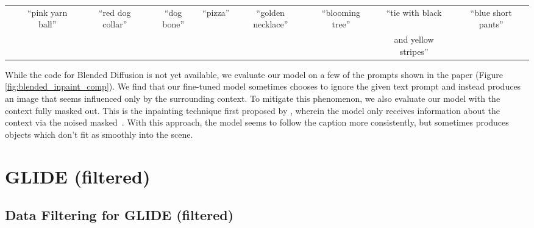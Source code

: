 \documentclass{article}
\newcommand{\modelname}{GLIDE}
\begin{document}
\begin{figure*}[t]
\begin{tabular}{ccccccccc}
        &
        \scriptsize{``pink yarn ball''} &
        \scriptsize{``red dog collar''} &
        \scriptsize{``dog bone''} &
        \scriptsize{``pizza''} &
        \scriptsize{``golden necklace''} &
        \scriptsize{``blooming tree''} &
        \scriptsize{``tie with black} &
        \scriptsize{``blue short pants''} \\

        &&&&&&& \scriptsize{and yellow stripes''} & \\
    \end{tabular}
    
    \caption{Comparison of image inpainting quality on real images. (1) Local CLIP-guided diffusion \citep{clipdiff}, (2) PaintByWord++ \citep{paintbyword,blendeddiff}, (3) Blended Diffusion \citep{blendeddiff}. For our results, we follow \citet{blendeddiff} and use CLIP to select the best of 64 samples. Our fine-tuned samples have more realistic lighting, shadows and textures, but sometimes don't focus on the prompt (eg. golden necklace), whereas implicit samples capture the prompt better.}
    \label{fig:blended_inpaint_comp}
    \vskip -0.1in
\end{figure*}

While the code for Blended Diffusion \citep{blendeddiff} is not yet available, we evaluate our model on a few of the prompts shown in the paper (Figure \ref{fig:blended_inpaint_comp}). We find that our fine-tuned model sometimes chooses to ignore the given text prompt and instead produces an image that seems influenced only by the surrounding context. To mitigate this phenomenon, we also evaluate our model with the context fully masked out. This is the inpainting technique first proposed by \citet{dickstein}, wherein the model only receives information about the context via the noised masked~. With this approach, the model seems to follow the caption more consistently, but sometimes produces objects which don't fit as smoothly into the scene.

\section{\modelname{} (filtered)}
\subsection{Data Filtering for \modelname{} (filtered)}
\label{app:data_filtering}
\end{document}
